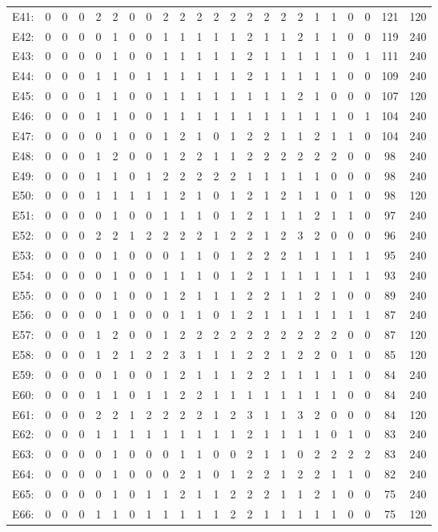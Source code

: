\documentclass[12pt]{article}
\begin{document}
\begin{center}
\scriptsize
\begin{tabular}{ccccccccccccccccccccc|c|c}
E41:&0&0&0&2&2&0&0&2&2&2&2&2&2&2&2&2&1&1&0&0&121&120\\
E42:&0&0&0&0&1&0&0&1&1&1&1&1&2&1&1&2&1&1&0&0&119&240\\
E43:&0&0&0&0&1&0&0&1&1&1&1&1&2&1&1&1&1&1&0&1&111&240\\
E44:&0&0&0&1&1&0&1&1&1&1&1&1&2&1&1&1&1&1&0&0&109&240\\
E45:&0&0&0&1&1&0&0&1&1&1&1&1&1&1&1&2&1&0&0&0&107&120\\
E46:&0&0&0&1&1&0&0&1&1&1&1&1&1&1&1&1&1&1&0&1&104&240\\
E47:&0&0&0&0&1&0&0&1&2&1&0&1&2&2&1&1&2&1&1&0&104&240\\
E48:&0&0&0&1&2&0&0&1&2&2&1&1&2&2&2&2&2&2&0&0&98&240\\
E49:&0&0&0&1&1&0&1&2&2&2&2&2&1&1&1&1&1&0&0&0&98&240\\
E50:&0&0&0&1&1&1&1&1&2&1&0&1&2&1&2&1&1&0&1&0&98&120\\
E51:&0&0&0&0&1&0&0&1&1&1&0&1&2&1&1&1&2&1&1&0&97&240\\
E52:&0&0&0&2&2&1&2&2&2&2&1&2&2&1&2&3&2&0&0&0&96&240\\
E53:&0&0&0&0&1&0&0&0&1&1&0&1&2&2&2&1&1&1&1&1&95&240\\
E54:&0&0&0&0&1&0&0&1&1&1&0&1&2&1&1&1&1&1&1&1&93&240\\
E55:&0&0&0&0&1&0&0&1&2&1&1&1&2&2&1&1&2&1&0&0&89&240\\
E56:&0&0&0&0&1&0&0&0&1&1&0&1&2&1&1&1&1&1&1&1&87&240\\
E57:&0&0&0&1&2&0&0&1&2&2&2&2&2&2&2&2&2&2&0&0&87&120\\
E58:&0&0&0&1&2&1&2&2&3&1&1&1&2&2&1&2&2&0&1&0&85&120\\
E59:&0&0&0&0&1&0&0&1&2&1&1&1&2&2&1&1&1&1&1&0&84&240\\
E60:&0&0&0&1&1&0&1&1&2&2&1&1&1&1&1&1&1&1&0&0&84&240\\
E61:&0&0&0&2&2&1&2&2&2&2&1&2&3&1&1&3&2&0&0&0&84&120\\
E62:&0&0&0&1&1&1&1&1&1&1&1&1&2&1&1&1&1&0&1&0&83&240\\
E63:&0&0&0&0&1&0&0&0&1&1&0&0&2&1&1&0&2&2&2&2&83&240\\
E64:&0&0&0&0&1&0&0&0&2&1&0&1&2&2&1&2&2&1&1&0&82&240\\
E65:&0&0&0&0&1&0&1&1&2&1&1&2&2&2&1&1&2&1&0&0&75&240\\
E66:&0&0&0&1&1&0&1&1&1&1&1&2&2&1&1&1&1&1&0&0&75&120\\

\end{tabular}
\end{center}
\end{document}
